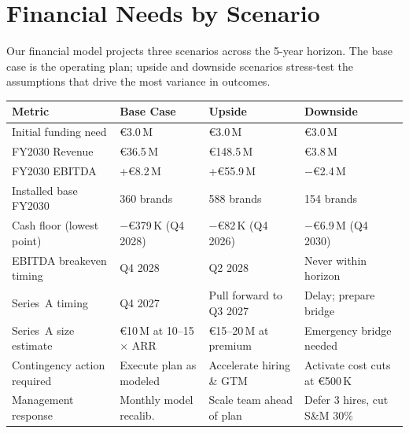 \documentclass[11pt,a4paper]{article}
\begin{document}
\section{Financial Needs by Scenario}

Our financial model projects three scenarios across the 5-year horizon. The base case is the operating plan; upside and downside scenarios stress-test the assumptions that drive the most variance in outcomes.

\vspace{-2pt}
\begin{table}[h!]
\centering
\scriptsize
\begin{tabularx}{\textwidth}{p{3.4cm}XXX}
\toprule
\textbf{Metric} & \textbf{Base Case} & \textbf{Upside} & \textbf{Downside} \\
\midrule
Initial funding need & \euro{}3.0\,M & \euro{}3.0\,M & \euro{}3.0\,M \\
FY2030 Revenue & \euro{}36.5\,M & \euro{}148.5\,M & \euro{}3.8\,M \\
FY2030 EBITDA & +\euro{}8.2\,M & +\euro{}55.9\,M & $-$\euro{}2.4\,M \\
Installed base FY2030 & 360 brands & 588 brands & 154 brands \\
Cash floor (lowest point) & $-$\euro{}379\,K (Q4 2028) & $-$\euro{}82\,K (Q4 2026) & $-$\euro{}6.9\,M (Q4 2030) \\
EBITDA breakeven timing & Q4 2028 & Q2 2028 & Never within horizon \\
Series~A timing & Q4 2027 & Pull forward to Q3 2027 & Delay; prepare bridge \\
Series~A size estimate & \euro{}10\,M at 10--15$\times$ ARR & \euro{}15--20\,M at premium & Emergency bridge needed \\
Contingency action required & Execute plan as modeled & Accelerate hiring \& GTM & Activate cost cuts at \euro{}500\,K \\
Management response & Monthly model recalib. & Scale team ahead of plan & Defer 3 hires, cut S\&M 30\% \\
\bottomrule
\end{tabularx}
\end{table}
\vspace{-2pt}
\end{document}
